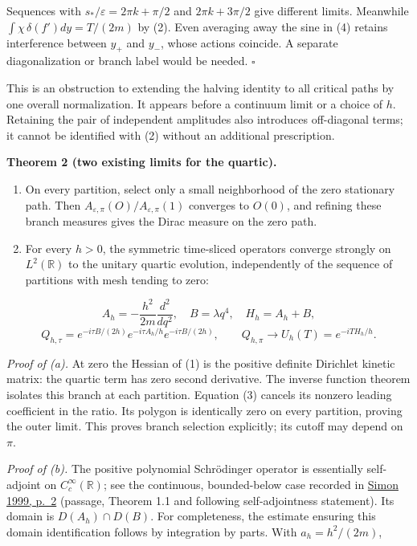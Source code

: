\documentclass[11pt,a4paper]{article}
\begin{document}
Sequences with \(s_*/\varepsilon=2\pi k+\pi/2\) and \(2\pi k+3\pi/2\)
give different limits. Meanwhile \(\int\chi\,\delta(f')dy=T/(2m)\) by
(2). Even averaging away the sine in (4) retains interference between
\(y_+\) and \(y_-\), whose actions coincide. A separate diagonalization
or branch label would be needed. \(\square\)

This is an obstruction to extending the halving identity to all critical
paths by one overall normalization. It appears before a continuum limit
or a choice of \(h\). Retaining the pair of independent amplitudes also
introduces off-diagonal terms; it cannot be identified with (2) without
an additional prescription.

\textbf{Theorem 2 (two existing limits for the quartic).}

\begin{enumerate}
\def\labelenumi{(\alph{enumi})}
\item
  On every partition, select only a small neighborhood of the zero
  stationary path. Then
  \(A_{\varepsilon,\pi}(O)/A_{\varepsilon,\pi}(1)\) converges to
  \(O(0)\), and refining these branch measures gives the Dirac measure
  on the zero path.
\item
  For every \(h>0\), the symmetric time-sliced operators converge
  strongly on \(L^2(\mathbb R)\) to the unitary quartic evolution,
  independently of the sequence of partitions with mesh tending to zero:
\end{enumerate}

\[
A_h=-\frac{h^2}{2m}\frac{d^2}{dq^2},\quad B=\lambda q^4,\quad
H_h=A_h+B,
\] \[
Q_{h,\tau}=e^{-i\tau B/(2h)}e^{-i\tau A_h/h}e^{-i\tau B/(2h)},
\qquad Q_{h,\pi}\longrightarrow U_h(T)=e^{-iTH_h/h}. \tag{5}
\]

\emph{Proof of (a).} At zero the Hessian of (1) is the positive definite
Dirichlet kinetic matrix: the quartic term has zero second derivative.
The inverse function theorem isolates this branch at each partition.
Equation (3) cancels its nonzero leading coefficient in the ratio. Its
polygon is identically zero on every partition, proving the outer limit.
This proves branch selection explicitly; its cutoff may depend on
\(\pi\).

\emph{Proof of (b).} The positive polynomial Schrödinger operator is
essentially self-adjoint on \(C_c^\infty(\mathbb R)\); see the
continuous, bounded-below case recorded in
\href{https://arxiv.org/pdf/math-ph/9907022}{Simon 1999, p.~2} (passage,
Theorem 1.1 and following self-adjointness statement). Its domain is
\(D(A_h)\cap D(B)\). For completeness, the estimate ensuring this domain
identification follows by integration by parts. With \(a_h=h^2/(2m)\),
\end{document}
